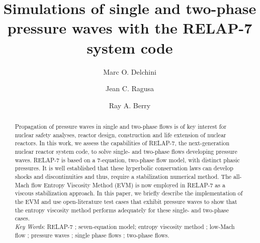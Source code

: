 \documentclass{inputs/mc2015}
\begin{document}
\title{Simulations of single and two-phase pressure waves with the RELAP-7 system code}

\author{Marc O. Delchini}
\author{Jean C. Ragusa}

\author{Ray A. Berry}

\maketitle

\begin{abstract}

Propagation of pressure waves in single and two-phase flows is of key interest for nuclear safety analyses, reactor design, construction and life extension of nuclear reactors. In this work, we assess the capabilities of RELAP-7, the next-generation nuclear reactor system code, to solve single- and two-phase flows developing pressure waves. RELAP-7 is based on a 7-equation, two-phase flow model, with distinct phasic pressures. It is well established that these hyperbolic conservation laws can develop shocks and discontinuities and thus, require a stabilization 
numerical method. The all-Mach flow Entropy Viscosity Method (EVM) is now employed in RELAP-7 as a viscous stabilization approach. 
In this paper, we briefly describe the implementation of the EVM and use open-literature test cases that exhibit pressure waves to show that the entropy viscosity method performs adequately for these single- and two-phase cases. \\
%
\emph{Key Words}:  RELAP-7 ; seven-equation model; entropy viscosity method ; low-Mach flow ; pressure waves ; single phase flows ; two-phase flows.
\end{abstract}
\end{document}

